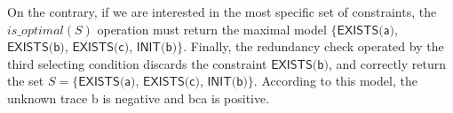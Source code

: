 On the contrary, if we are interested in the most specific set of constraints, the ${is\_optimal}(S)$ operation must return the maximal model $\{\textsf{EXISTS(a)}$, $\textsf{EXISTS(b)}$, $\textsf{EXISTS(c)}$, $\textsf{INIT(b)}\}$. Finally, the redundancy check operated by the third selecting condition discards the constraint $\textsf{EXISTS(b)}$, and correctly return the set $S=$$\{\textsf{EXISTS(a)}$, $\textsf{EXISTS(c)}$, $\textsf{INIT(b)}\}$. According to this model, the unknown trace \textsf{b} is negative and \textsf{bca} is positive. 


%
%
%
%


